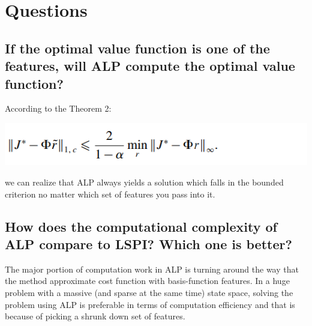\documentclass[a4paper,12pt]{article}
\begin{document}
\section{Questions}
\subsection{ If the optimal value function is one of the features, will ALP compute the optimal value function?}
According to the Theorem 2:

\includegraphics[width=1\columnwidth]{alp-theorem2.png}

we can realize that ALP always yields a solution which falls in the bounded criterion no matter which set of features you pass into it.

\subsection{How does the computational complexity of ALP compare to LSPI? Which one is better?}
The major portion of computation work in ALP is turning around the way that the method approximate cost function with basis-function features. In a huge problem with a massive (and sparse at the same time) state space, solving the problem using ALP is preferable in terms of computation efficiency and that is because of picking a shrunk down set of features.




\end{document}
